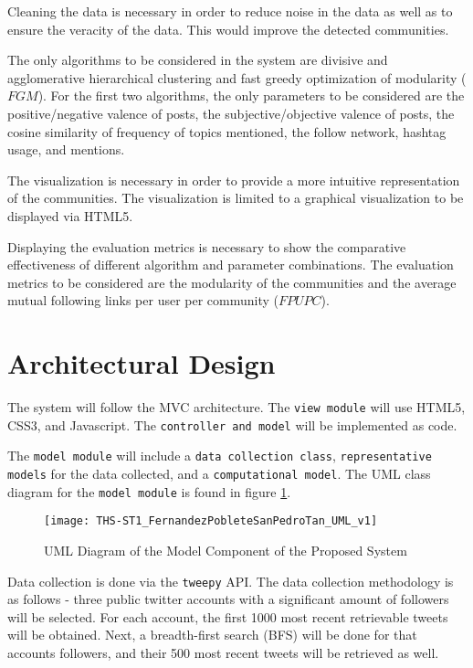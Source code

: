 Cleaning the data is necessary in order to reduce noise in the data as well as to ensure the veracity of the data. This 
would improve the detected communities.


The only algorithms to be considered in the system are divisive and agglomerative hierarchical clustering and fast greedy optimization
of modularity ($FGM$). For the first two algorithms, the only parameters to be considered are the positive/negative valence of posts, 
the subjective/objective valence of posts, the cosine similarity of frequency of topics mentioned, the follow network, hashtag usage,
and mentions.


The visualization is necessary in order to provide a more intuitive representation of the communities. The visualization is limited to 
a graphical visualization to be displayed via HTML5.


Displaying the evaluation metrics is necessary to show the comparative effectiveness of different algorithm and parameter combinations.
The evaluation metrics to be considered are the modularity of the communities and the average mutual following links per user per community
($FPUPC$).




\section{Architectural Design}
The system will follow the MVC architecture. The \texttt{view module} will use HTML5, CSS3, and Javascript. The 
\texttt{controller and model} will be implemented as code.


The \texttt{model module} will include a \texttt{data collection class}, \texttt{representative models} for the data collected, and a \texttt{computational model}.
The UML class diagram for the \texttt{model module} is found in figure \ref{fig:uml}.


\newpage


\begin{landscape}
	\begin{figure}
		\centering
		\texttt{[image: THS-ST1\_FernandezPobleteSanPedroTan\_UML\_v1]}
		\caption{UML Diagram of the Model Component of the Proposed System}
		\label{fig:uml}	
	\end{figure}
\end{landscape}


\newpage


Data collection is done via the \texttt{tweepy} API. The data collection methodology is as follows - three public twitter accounts with a significant amount of followers will be selected. For each account, the first 1000 most recent retrievable tweets will be obtained. Next, a breadth-first search (BFS) will be done for that account\vtick s followers, and their 500 most recent tweets will be retrieved as well. 




